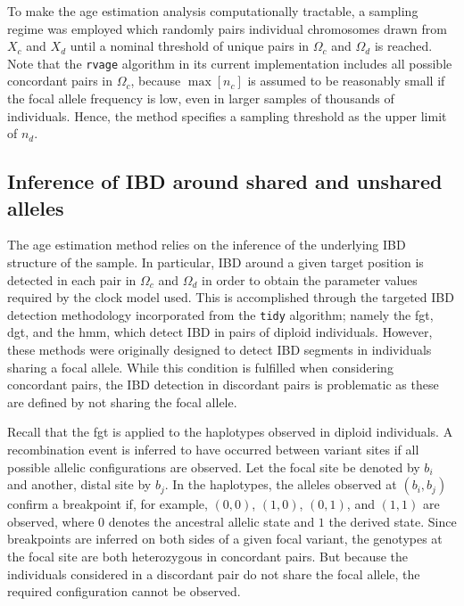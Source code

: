 To make the age estimation analysis computationally tractable, a sampling regime was employed which randomly pairs individual chromosomes drawn from $X_c$ and $X_d$ until a nominal threshold of unique pairs in $\Omega_c$ and $\Omega_d$ is reached.
Note that the \texttt{rvage} algorithm in its current implementation includes all possible concordant pairs in $\Omega_c$, because ${\max[n_c]}$ is assumed to be reasonably small if the focal allele frequency is low, even in larger samples of thousands of individuals.
Hence, the method specifies a sampling threshold as the upper limit of $n_d$.


%
\subsection{Inference of IBD around shared and unshared alleles}
%

The age estimation method relies on the inference of the underlying IBD structure of the sample.
In particular, IBD around a given target position is detected in each pair in $\Omega_c$ and $\Omega_d$ in order to obtain the parameter values required by the clock model used.
This is accomplished through the targeted IBD detection methodology incorporated from the \texttt{tidy} algorithm; namely the \gls{fgt}, \gls{dgt}, and the \gls{hmm}, which detect IBD in pairs of diploid individuals.
However, these methods were originally designed to detect IBD segments in individuals sharing a focal allele.
While this condition is fulfilled when considering concordant pairs, the IBD detection in discordant pairs is problematic as these are defined by not sharing the focal allele.

%

%

Recall that the \gls{fgt} is applied to the  haplotypes observed in  diploid individuals.
A recombination event is inferred to have occurred between  variant sites if all  possible allelic configurations are observed.
Let the focal site be denoted by $b_i$ and another, distal site by $b_j$.
In the  haplotypes, the alleles observed at ${(b_i,b_j)}$ confirm a breakpoint if, for example, ${(0,0)}$, ${(1,0)}$, ${(0,1)}$, and ${(1,1)}$ are observed, where $0$ denotes the ancestral allelic state and $1$ the derived state.
Since breakpoints are inferred on both sides of a given focal variant, the genotypes at the focal site are both heterozygous in concordant pairs.
But because the  individuals considered in a discordant pair do not share the focal allele, the required configuration cannot be observed.


